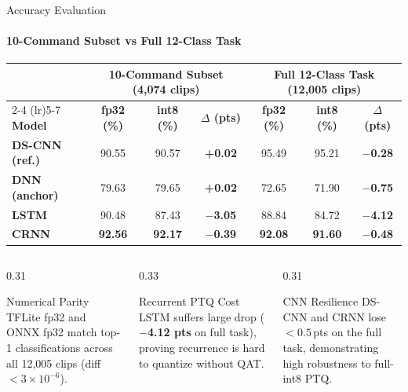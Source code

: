 \documentclass[aspectratio=169]{beamer}
\begin{document}
\begin{frame}{Accuracy Evaluation}
\framesubtitle{10-Command Subset vs Full 12-Class Task}
\begin{table}[h]
\centering
\scriptsize
\setlength{\tabcolsep}{5pt}
\begin{tabular}{lcccccc}
\toprule
& \multicolumn{3}{c}{\textbf{10-Command Subset (4,074 clips)}} & \multicolumn{3}{c}{\textbf{Full 12-Class Task (12,005 clips)}} \\
\cmidrule(lr){2-4} \cmidrule(lr){5-7}
\textbf{Model} & \textbf{fp32 (\%)} & \textbf{int8 (\%)} & \textbf{$\Delta$ (pts)} & \textbf{fp32 (\%)} & \textbf{int8 (\%)} & \textbf{$\Delta$ (pts)} \\
\midrule
\textbf{DS-CNN (ref.)} & 90.55 & 90.57 & \textbf{+0.02} & 95.49 & 95.21 & \textbf{$-$0.28} \\
\textbf{DNN (anchor)}   & 79.63 & 79.65 & \textbf{+0.02} & 72.65 & 71.90 & \textbf{$-$0.75} \\
\textbf{LSTM}          & 90.48 & 87.43 & \textbf{$-$3.05} & 88.84 & 84.72 & \textbf{$-$4.12} \\
\textbf{CRNN}          & \textbf{92.56} & \textbf{92.17} & \textbf{$-$0.39} & \textbf{92.08} & \textbf{91.60} & \textbf{$-$0.48} \\
\bottomrule
\end{tabular}
\end{table}

\begin{columns}[T]
  \begin{column}{0.31\textwidth}
    \begin{exampleblock}{Numerical Parity}
      \scriptsize TFLite fp32 and ONNX fp32 match top-1 classifications across all 12,005 clips (diff $<3\times 10^{-6}$).
    \end{exampleblock}
  \end{column}
  \begin{column}{0.33\textwidth}
    \begin{alertblock}{Recurrent PTQ Cost}
      \scriptsize LSTM suffers large drop (\textbf{$-$4.12 pts} on full task), proving recurrence is hard to quantize without QAT.
    \end{alertblock}
  \end{column}
  \begin{column}{0.31\textwidth}
    \begin{block}{CNN Resilience}
      \scriptsize DS-CNN and CRNN lose $<0.5$\,pts on the full task, demonstrating high robustness to full-int8 PTQ.
    \end{block}
  \end{column}
\end{columns}
\end{frame}
\end{document}
